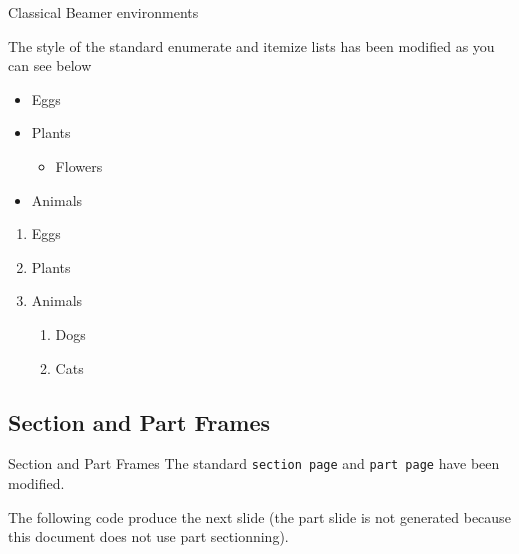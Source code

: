 \documentclass[10pt,aspectratio=169,english]{beamer}
\begin{document}
\begin{frame}{Classical Beamer environments}
\framebreak
{}

The style of the standard enumerate and itemize lists has been modified as you
can see below

\begin{multicols}{2}
  \begin{itemize}
\item Eggs
\item Plants
  \begin{itemize}
  \item Flowers
  \end{itemize}
\item Animals
\end{itemize}
\columnbreak
\begin{enumerate}
\item Eggs
\item Plants
\item Animals
  \begin{enumerate}
  \item Dogs
  \item Cats
  \end{enumerate}
\end{enumerate}
\end{multicols}
\end{frame}


\subsection{Section and Part Frames}

\newsavebox{\codebox}%
\begin{lrbox}{\codebox}
  \begin{Code}
\begin{frame}
\sectionpage
\end{frame}

\end{Code}
\end{lrbox}

\begin{frame}[fragile]{Section and Part Frames}
  The standard \texttt{section page} and \texttt{part page} have been modified.

  The following code produce the next slide (the part slide is not generated
  because this document does not use part sectionning).

  \usebox{\codebox}

\end{frame}
\end{document}
